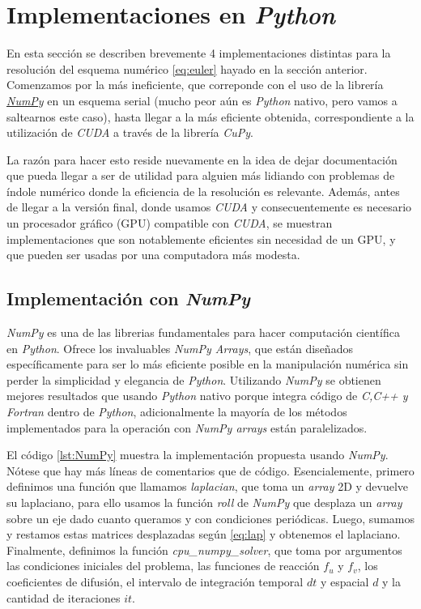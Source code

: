 \section{Implementaciones en \textit{Python}}
\label{S:Python}

En esta sección se describen brevemente 4 implementaciones distintas para la resolución del esquema numérico \ref{eq:euler} hayado en la sección anterior. Comenzamos por 
la más ineficiente, que correponde con el uso de la librería \href{https://numpy.org/}{\textit{NumPy}} en un esquema serial (mucho peor aún es \textit{Python} nativo, pero vamos a saltearnos este caso), 
hasta llegar a la más eficiente obtenida, correspondiente a la utilización de \textit{CUDA} a través de la librería \textit{CuPy}. 

La razón para hacer esto reside nuevamente en la idea de dejar documentación que pueda llegar a ser de utilidad para alguien más lidiando 
con problemas de índole numérico donde la eficiencia de la resolución es relevante. Además, antes de llegar a la versión final, donde usamos \textit{CUDA} y 
consecuentemente es necesario un procesador gráfico (GPU) compatible con \textit{CUDA}, se muestran implementaciones que son notablemente eficientes sin necesidad 
de un GPU, y que pueden ser usadas por una computadora más modesta.

\subsection{Implementación con \textit{NumPy}}
\label{SS:NumPy}
\textit{NumPy} es una de las librerias fundamentales para hacer computación científica en \textit{Python}. Ofrece los invaluables \textit{NumPy Arrays}, que están diseñados 
específicamente para ser lo más eficiente posible en la manipulación numérica sin perder la simplicidad y elegancia de \textit{Python}. Utilizando \textit{NumPy} 
se obtienen mejores resultados que usando \textit{Python} nativo porque integra código de \textit{C,C++ y Fortran} dentro de \textit{Python}, adicionalmente la mayoría 
de los métodos implementados para la operación con \textit{NumPy arrays} están paralelizados.

El código \ref{lst:NumPy} muestra la implementación propuesta usando \textit{NumPy}. Nótese que hay más líneas de comentarios que de código. Esencialemente, 
primero definimos una función que llamamos \textit{laplacian}, que toma un \textit{array} 2D 
y devuelve su laplaciano, para ello usamos la función \textit{roll} de \textit{NumPy} que desplaza un \textit{array} sobre un eje dado
cuanto queramos y con condiciones periódicas.
Luego, sumamos y restamos estas matrices desplazadas según \ref{eq:lap} y obtenemos el laplaciano. Finalmente, definimos la función \textit{cpu\_numpy\_solver}, que toma 
por argumentos las condiciones iniciales del problema, las funciones de reacción $f_u$ y $f_v$, los coeficientes de difusión, 
el intervalo de integración temporal $dt$ y espacial $d$ y la cantidad de iteraciones $it$. 

